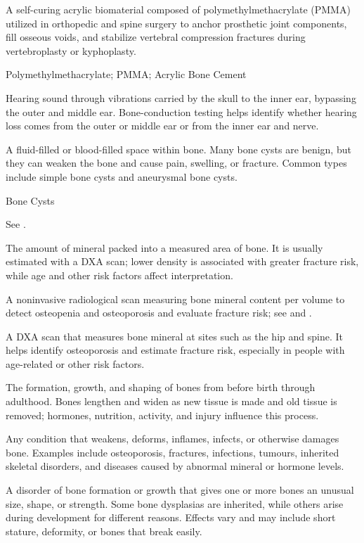  A self-curing acrylic biomaterial composed of polymethylmethacrylate (PMMA) utilized in orthopedic and spine surgery to anchor prosthetic joint components, fill osseous voids, and stabilize vertebral compression fractures during vertebroplasty or kyphoplasty.

\synonyms
Polymethylmethacrylate; PMMA; Acrylic Bone Cement

 Hearing sound through vibrations carried by the skull to the inner ear, bypassing the outer and middle ear. Bone-conduction testing helps identify whether hearing loss comes from the outer or middle ear or from the inner ear and nerve.

 A fluid-filled or blood-filled space within bone. Many bone cysts are benign, but they can weaken the bone and cause pain, swelling, or fracture. Common types include simple bone cysts and aneurysmal bone cysts.

\synonyms
Bone Cysts

 See .

 The amount of mineral packed into a measured area of bone. It is usually estimated with a DXA scan; lower density is associated with greater fracture risk, while age and other risk factors affect interpretation.

 A noninvasive radiological scan measuring bone mineral content per volume to detect osteopenia and osteoporosis and evaluate fracture risk; see  and .

 A DXA scan that measures bone mineral at sites such as the hip and spine. It helps identify osteoporosis and estimate fracture risk, especially in people with age-related or other risk factors.

 The formation, growth, and shaping of bones from before birth through adulthood. Bones lengthen and widen as new tissue is made and old tissue is removed; hormones, nutrition, activity, and injury influence this process.

 Any condition that weakens, deforms, inflames, infects, or otherwise damages bone. Examples include osteoporosis, fractures, infections, tumours, inherited skeletal disorders, and diseases caused by abnormal mineral or hormone levels.

 A disorder of bone formation or growth that
  gives one or more bones an unusual size, shape, or strength. Some bone
  dysplasias are inherited, while others arise during development for
  different reasons. Effects vary and may include short stature,
  deformity, or bones that break easily.

